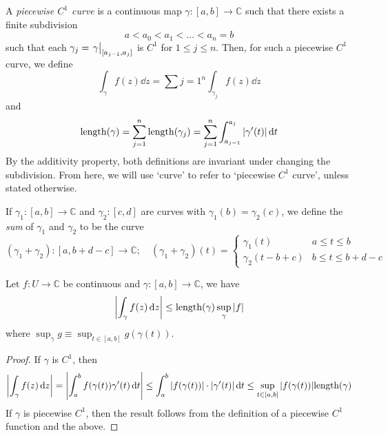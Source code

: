\begin{definition}
	A \textit{piecewise \( C^1 \) curve} is a continuous map \( \gamma \colon [a,b] \to \mathbb C \) such that there exists a finite subdivision
	\[ a < a_0 < a_1 < \dots < a_n = b \]
	such that each \( \gamma_j = \eval{\gamma}_{[a_{j-1}, a_j]} \) is \( C^1 \) for \( 1 \leq j \leq n \).
	Then, for such a piecewise \( C^1 \) curve, we define
	\[ \int_\gamma f(z) \dd{z} = \sum{j=1}^n \int_{\gamma_j} f(z) \dd{z} \]
	and
	\[ \mathrm{length}(\gamma) = \sum_{j=1}^n \mathrm{length}(\gamma_j) = \sum_{j=1}^n \int_{a_{j-1}}^{a_j} \abs{\gamma'(t)} \dd{t} \]
	By the additivity property, both definitions are invariant under changing the subdivision.
	From here, we will use `curve' to refer to `piecewise \( C^1 \) curve', unless stated otherwise.
\end{definition}
\begin{definition}
	If \( \gamma_1 \colon [a,b] \to \mathbb C \) and \( \gamma_2 \colon [c,d] \) are curves with \( \gamma_1(b) = \gamma_2(c) \), we define the \textit{sum} of \( \gamma_1 \) and \( \gamma_2 \) to be the curve
	\[ (\gamma_1 + \gamma_2) \colon [a,b+d-c] \to \mathbb C;\quad (\gamma_1 + \gamma_2)(t) = \begin{cases}
		\gamma_1(t) & a \leq t \leq b \\
		\gamma_2(t - b + c) & b \leq t \leq b + d - c
	\end{cases} \]
\end{definition}
\begin{proposition}
	Let \( f \colon U \to \mathbb C \) be continuous and \( \gamma \colon [a,b] \to \mathbb C \), we have
	\[ \abs{\int_\gamma f(z) \dd{z}} \leq \mathrm{length}(\gamma) \sup_\gamma \abs{f} \]
	where \( \sup_\gamma g \equiv \sup_{t \in [a,b]} g(\gamma(t)) \).
\end{proposition}
\begin{proof}
	If \( \gamma \) is \( C^1 \), then
	\[ \abs{\int_\gamma f(z) \dd{z}} = \abs{\int_a^b f(\gamma(t)) \gamma'(t) \dd{t}} \leq \int_a^b \abs{f(\gamma(t))} \cdot \abs{\gamma'(t)} \dd{t} \leq \sup_{t \in [a,b]} \abs{f(\gamma(t))} \mathrm{length}(\gamma) \]
	If \( \gamma \) is piecewise \( C^1 \), then the result follows from the definition of a piecewise \( C^1 \) function and the above.
\end{proof}

